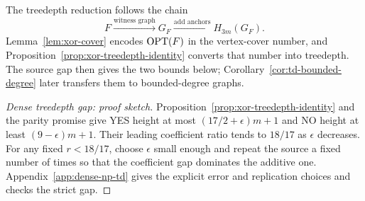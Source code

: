 The treedepth reduction follows the chain
\[
 F\xrightarrow{\text{witness graph}}G_F
 \xrightarrow{\text{add anchors}}H_{3m}(G_F).
\]
Lemma~\ref{lem:xor-cover} encodes $\operatorname{OPT}(F)$ in the vertex-cover
number, and Proposition~\ref{prop:xor-treedepth-identity} converts
that number into treedepth. The source gap then gives
the two bounds below; Corollary~\ref{cor:td-bounded-degree} later
transfers them to bounded-degree graphs.

\begin{proof}[Dense treedepth gap: proof sketch]
Proposition~\ref{prop:xor-treedepth-identity} and the parity promise
give YES height at most $(17/2+\epsilon)m+1$ and NO height at least
$(9-\epsilon)m+1$. Their leading coefficient ratio tends to
$18/17$ as $\epsilon$ decreases. For any fixed $r<18/17$, choose
$\epsilon$ small enough and repeat the source a fixed number of
times so that the coefficient gap dominates the additive one.
Appendix~\ref{app:dense-np-td} gives the explicit error and
replication choices and checks the strict gap.
\end{proof}
